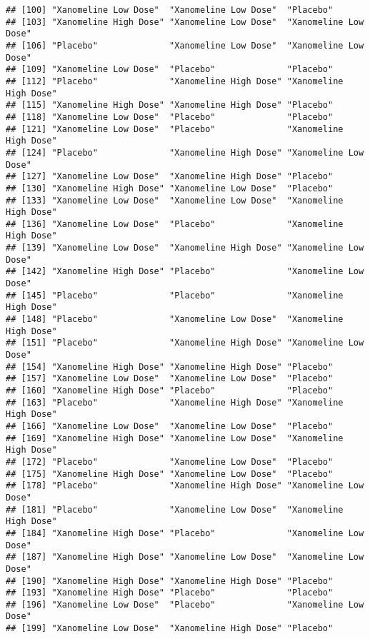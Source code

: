 \documentclass[]{book}
\begin{document}
\begin{verbatim}
## [100] "Xanomeline Low Dose"  "Xanomeline Low Dose"  "Placebo"             
## [103] "Xanomeline High Dose" "Xanomeline Low Dose"  "Xanomeline Low Dose" 
## [106] "Placebo"              "Xanomeline Low Dose"  "Xanomeline Low Dose" 
## [109] "Xanomeline Low Dose"  "Placebo"              "Placebo"             
## [112] "Placebo"              "Xanomeline High Dose" "Xanomeline High Dose"
## [115] "Xanomeline High Dose" "Xanomeline High Dose" "Placebo"             
## [118] "Xanomeline Low Dose"  "Placebo"              "Placebo"             
## [121] "Xanomeline Low Dose"  "Placebo"              "Xanomeline High Dose"
## [124] "Placebo"              "Xanomeline High Dose" "Xanomeline Low Dose" 
## [127] "Xanomeline Low Dose"  "Xanomeline High Dose" "Placebo"             
## [130] "Xanomeline High Dose" "Xanomeline Low Dose"  "Placebo"             
## [133] "Xanomeline Low Dose"  "Xanomeline Low Dose"  "Xanomeline High Dose"
## [136] "Xanomeline Low Dose"  "Placebo"              "Xanomeline High Dose"
## [139] "Xanomeline Low Dose"  "Xanomeline High Dose" "Xanomeline Low Dose" 
## [142] "Xanomeline High Dose" "Placebo"              "Xanomeline Low Dose" 
## [145] "Placebo"              "Placebo"              "Xanomeline High Dose"
## [148] "Placebo"              "Xanomeline Low Dose"  "Xanomeline High Dose"
## [151] "Placebo"              "Xanomeline High Dose" "Xanomeline Low Dose" 
## [154] "Xanomeline High Dose" "Xanomeline High Dose" "Placebo"             
## [157] "Xanomeline Low Dose"  "Xanomeline Low Dose"  "Placebo"             
## [160] "Xanomeline High Dose" "Placebo"              "Placebo"             
## [163] "Placebo"              "Xanomeline High Dose" "Xanomeline High Dose"
## [166] "Xanomeline Low Dose"  "Xanomeline Low Dose"  "Placebo"             
## [169] "Xanomeline High Dose" "Xanomeline Low Dose"  "Xanomeline High Dose"
## [172] "Placebo"              "Xanomeline Low Dose"  "Placebo"             
## [175] "Xanomeline High Dose" "Xanomeline Low Dose"  "Placebo"             
## [178] "Placebo"              "Xanomeline High Dose" "Xanomeline Low Dose" 
## [181] "Placebo"              "Xanomeline Low Dose"  "Xanomeline High Dose"
## [184] "Xanomeline High Dose" "Placebo"              "Xanomeline Low Dose" 
## [187] "Xanomeline High Dose" "Xanomeline Low Dose"  "Xanomeline Low Dose" 
## [190] "Xanomeline High Dose" "Xanomeline High Dose" "Placebo"             
## [193] "Xanomeline High Dose" "Placebo"              "Placebo"             
## [196] "Xanomeline Low Dose"  "Placebo"              "Xanomeline Low Dose" 
## [199] "Xanomeline Low Dose"  "Xanomeline High Dose" "Placebo"             

\end{verbatim}
\end{document}
